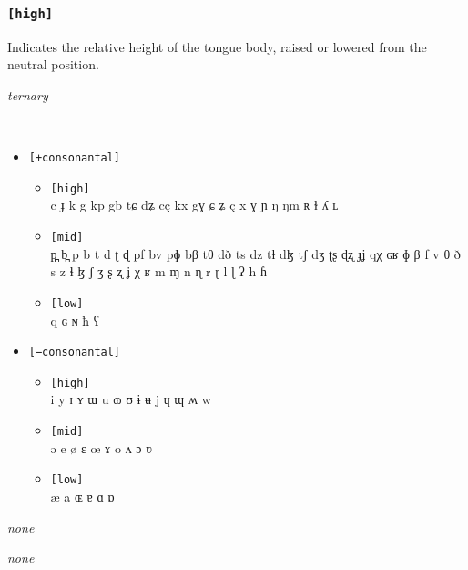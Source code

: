 \documentclass[10pt,letterpaper]{article}
\begin{document}
\subsubsection{\texttt{[high]}}
\label{ssub:feature_high}
\begin{samepage}
\begin{description}
\itemsep1pt \parskip0pt  
\item[Descritpion] Indicates the relative height of the tongue body, raised or lowered from the neutral position.
\item[Type] \emph{ternary}
\item[Examples]\
  \begin{itemize}
    \item \texttt{[+consonantal]}
    \begin{itemize}
      \item \texttt{[high]}\\
      c ɟ k g kp gb tɕ dʑ cç kx gɣ ɕ ʑ ç x ɣ ɲ ŋ ŋm ʀ ɫ ʎ ʟ 
      \item \texttt{[mid]}\\
      p̪ b̪ p b t d ʈ ɖ pf bv pɸ bβ tθ dð ts dz tɬ dɮ tʃ dʒ ʈʂ ɖʐ ɟʝ qχ ɢʁ ɸ β f v θ ð s z ɬ ɮ ʃ ʒ ʂ ʐ ʝ χ ʁ m ɱ n ɳ r ɽ l ɭ ʔ h ɦ 
      \item \texttt{[low]}\\
      q ɢ ɴ ħ ʕ 
    \end{itemize}
    \item  \texttt{[−consonantal]}
    \begin{itemize}
      \item \texttt{[high]}\\
      i y ɪ ʏ ɯ u ɷ ʊ ɨ ʉ j ɥ ɰ ʍ w 
      \item \texttt{[mid]}\\
      ə e ø ɛ œ ɤ o ʌ ɔ ʋ 
      \item \texttt{[low]}\\
      æ a ɶ ɐ ɑ ɒ 
    \end{itemize}
  \end{itemize}
\item[Constraints] \emph{none}
\item[Resctrictions] \emph{none}
\end{description}
\end{samepage}
\end{document}
